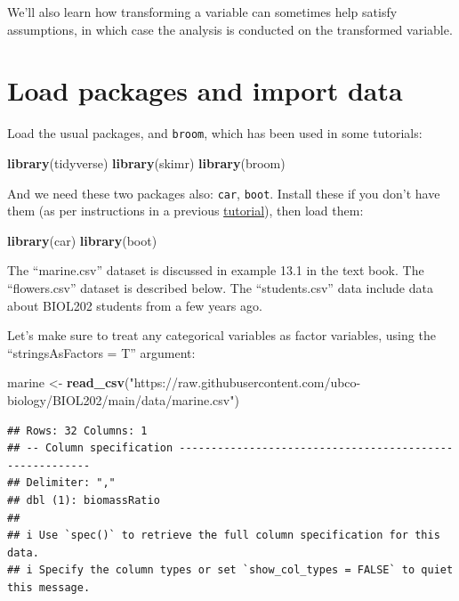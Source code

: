 \documentclass[
]{book}
\newenvironment{Shaded}{\begin{snugshade}}{\end{snugshade}}
\newcommand{\FunctionTok}[1]{\textcolor[rgb]{0.13,0.29,0.53}{\textbf{#1}}}
\newcommand{\NormalTok}[1]{#1}
\newcommand{\OtherTok}[1]{\textcolor[rgb]{0.56,0.35,0.01}{#1}}
\newcommand{\StringTok}[1]{\textcolor[rgb]{0.31,0.60,0.02}{#1}}
\begin{document}
We'll also learn how transforming a variable can sometimes help satisfy assumptions, in which case the analysis is conducted on the transformed variable.

\section{Load packages and import data}\label{assumptions_packages_data}

Load the usual packages, and \texttt{broom}, which has been used in some tutorials:

\begin{Shaded}
\begin{Highlighting}[]
\FunctionTok{library}\NormalTok{(tidyverse)}
\FunctionTok{library}\NormalTok{(skimr)}
\FunctionTok{library}\NormalTok{(broom)}
\end{Highlighting}
\end{Shaded}

And we need these two packages also: \texttt{car}, \texttt{boot}. Install these if you don't have them (as per instructions in a previous \hyperref[package_install]{tutorial}), then load them:

\begin{Shaded}
\begin{Highlighting}[]
\FunctionTok{library}\NormalTok{(car)  }
\FunctionTok{library}\NormalTok{(boot)}
\end{Highlighting}
\end{Shaded}

The ``marine.csv'' dataset is discussed in example 13.1 in the text book. The ``flowers.csv'' dataset is described below. The ``students.csv'' data include data about BIOL202 students from a few years ago.

Let's make sure to treat any categorical variables as factor variables, using the ``stringsAsFactors = T'' argument:

\begin{Shaded}
\begin{Highlighting}[]
\NormalTok{marine }\OtherTok{\textless{}{-}} \FunctionTok{read\_csv}\NormalTok{(}\StringTok{"https://raw.githubusercontent.com/ubco{-}biology/BIOL202/main/data/marine.csv"}\NormalTok{)}
\end{Highlighting}
\end{Shaded}

\begin{verbatim}
## Rows: 32 Columns: 1
## -- Column specification --------------------------------------------------------
## Delimiter: ","
## dbl (1): biomassRatio
## 
## i Use `spec()` to retrieve the full column specification for this data.
## i Specify the column types or set `show_col_types = FALSE` to quiet this message.
\end{verbatim}
\end{document}
